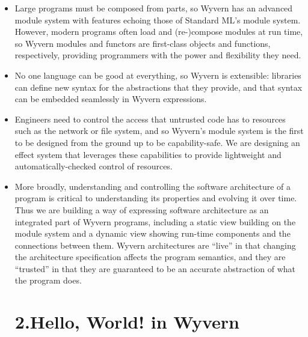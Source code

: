 \documentclass{article}
\begin{document}
\begin{itemize}[noitemsep,topsep=\mdcompacttopsep]%

\item{}
Large programs must be composed from parts, so Wyvern has an
advanced module system with features echoing those of Standard
ML's module system.  However, modern programs often load and
(re-)compose modules at run time, so Wyvern modules and functors
are first-class objects and functions, respectively, providing
programmers with the power and flexibility they need.%

\item{}
No one language can be good at everything, so Wyvern is extensible:
libraries can define new syntax for the abstractions that they
provide, and that syntax can be embedded seamlessly in Wyvern
expressions.%

\item{}
Engineers need to control the access that untrusted code has to
resources such as the network or file system, and so Wyvern's module
system is the first to be designed from the ground up to be
capability-safe.  We are designing an effect system that leverages
these capabilities to provide lightweight and automatically-checked
control of resources.%

\item{}
More broadly, understanding and controlling the software architecture
of a program is critical to understanding its properties and evolving
it over time.  Thus we are building a way of expressing software
architecture as an integrated part of Wyvern programs, including a
static view building on the module system and a dynamic view showing
run-time components and the connections between them.  Wyvern
architectures are \textquotedblleft{}live\textquotedblright{} in that changing the architecture specification
affects the program semantics, and they are \textquotedblleft{}trusted\textquotedblright{} in that they are
guaranteed to be an accurate abstraction of what the program does.%

\section{2.\hspace*{0.5em}Hello, World! in Wyvern}\label{sec-hello-world-in-wyvern}%
\end{itemize}%
\end{document}
